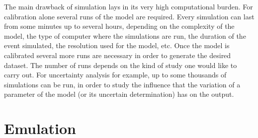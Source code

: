 The main drawback of simulation lays in its very high computational burden.
For calibration alone several runs of the model are required.
Every simulation can last from some minutes up to several hours, depending on the complexity of the model, the type of computer where the simulations are run, the duration of the event simulated, the resolution used for the model, etc.
Once the model is calibrated several more runs are necessary in order to generate the desired dataset.
The number of runs depends on the kind of study one would like to carry out.
For uncertainty analysis for example, up to some thousands of simulations can be run, in order to study the influence that the variation of a parameter of the model (or its uncertain determination) has on the output.


\section{Emulation}
